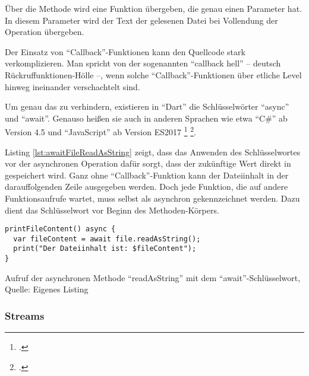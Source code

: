 Über die Methode  wird eine Funktion übergeben, die genau einen Parameter hat.
In diesem Parameter wird der Text der gelesenen Datei bei Vollendung der Operation übergeben.

Der Einsatz von \enquote{Callback}-Funktionen kann den Quellcode stark verkomplizieren.
 Man spricht von der sogenannten \enquote{callback hell} -- deutsch Rückruffunktionen-Hölle --, wenn solche \enquote{Callback}-Funktionen über etliche Level hinweg ineinander verschachtelt sind.

 \clearpage
Um genau das zu verhindern, existieren in \enquote{Dart} die Schlüsselwörter \enquote{async} und \enquote{await}.
Genauso heißen sie auch in anderen Sprachen wie etwa \enquote{C\#} ab Version 4.5 und \enquote{JavaScript} ab Version ES2017
\footcite[Vgl.][]{asyncfunctionJavaScriptMDN}
\footcite[Vgl.][]{Asynchronousprogrammingwithasyncandawait}.





Listing \ref{lst:awaitFileReadAsString} zeigt,
dass das Anwenden des Schlüsselwortes  vor der asynchronen Operation  dafür sorgt,
dass der zukünftige Wert direkt in  gespeichert wird.
Ganz ohne \enquote{Callback}-Funktion kann der Dateiinhalt in der darauffolgenden Zeile ausgegeben werden.
Doch jede Funktion, die auf andere Funktionsaufrufe wartet, muss selbst als asynchron gekennzeichnet werden.
Dazu dient das  Schlüsselwort vor Beginn des Methoden-Körpers.

\ifIncludeFigures
  \begin{listing}[ht]
    \begin{verbatim}
printFileContent() async {
  var fileContent = await file.readAsString();
  print("Der Dateiinhalt ist: $fileContent");
}
\end{verbatim}
    \caption[Aufruf der asynchronen Methode \enquote{readAsString} mit dem \enquote{await}-Schlüsselwort]{Aufruf der asynchronen Methode \enquote{readAsString} mit dem \enquote{await}-Schlüsselwort, Quelle: Eigenes Listing}
    \label{lst:awaitFileReadAsString}
  \end{listing}
\fi



\subsubsection{Streams}

